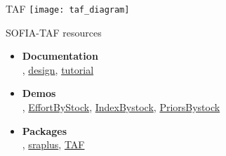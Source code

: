 \documentclass[aspectratio=169]{beamer}
\begin{document}

\begin{frame}{TAF}
  \centering
  \texttt{[image: taf\_diagram]}
\end{frame}


\begin{frame}[plain]
\end{frame}


\begin{frame}[plain]
\end{frame}


\begin{frame}{SOFIA-TAF resources}
  \begin{itemize}
    \item[] {\bf\darkgray Documentation}\\[0.5ex]
    ,
    {\blue\href{https://arni-magnusson.github.io/pdf/2022-sofia-taf.pdf}{design}},
    {\blue\href{https://github.com/sofia-taf/doc/blob/main/sofia_taf_tutorial.md}{tutorial}}\\[5ex]
    \item[] {\bf\darkgray Demos}\\[0.5ex]
    ,
    {\blue\href{https://github.com/sofia-taf/WorkshopEffortByStock}{EffortByStock}},
    {\blue\href{https://github.com/sofia-taf/WorkshopIndexByStock}{IndexBystock}},
    {\blue\href{https://github.com/sofia-taf/WorkshopPriorsByStock}{PriorsBystock}}\\[5ex]
    \item[] {\bf\darkgray Packages}\\[0.5ex]
    ,
    {\blue\href{https://github.com/DanOvando/sraplus}{sraplus}},
    {\blue\href{https://github.com/ices-tools-prod/TAF}{TAF}}
  \end{itemize}
\end{frame}
\end{document}
